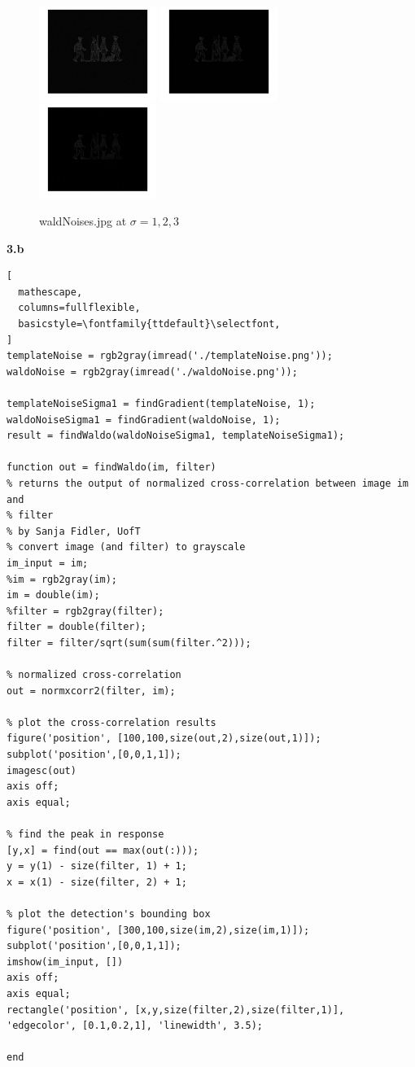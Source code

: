 \documentclass[11pt]{article}
\begin{document}
\begin{figure}[h]
  \caption{waldNoises.jpg at $\sigma = 1, 2, 3$ }
    \includegraphics[width=0.34\textwidth]{waldoNoiseSigma1}
    \includegraphics[width=0.34\textwidth]{waldoNoiseSigma2}
    \includegraphics[width=0.34\textwidth]{waldoNoiseSigma3}
\end{figure}

\newpage
\noindent
\textbf{3.b} 
\begin{lstlisting}[
  mathescape,
  columns=fullflexible,
  basicstyle=\fontfamily{ttdefault}\selectfont,
]
templateNoise = rgb2gray(imread('./templateNoise.png'));
waldoNoise = rgb2gray(imread('./waldoNoise.png'));

templateNoiseSigma1 = findGradient(templateNoise, 1);
waldoNoiseSigma1 = findGradient(waldoNoise, 1);
result = findWaldo(waldoNoiseSigma1, templateNoiseSigma1);

function out = findWaldo(im, filter)
% returns the output of normalized cross-correlation between image im and
% filter 
% by Sanja Fidler, UofT
% convert image (and filter) to grayscale
im_input = im;
%im = rgb2gray(im);
im = double(im);
%filter = rgb2gray(filter);
filter = double(filter);
filter = filter/sqrt(sum(sum(filter.^2)));

% normalized cross-correlation
out = normxcorr2(filter, im);

% plot the cross-correlation results
figure('position', [100,100,size(out,2),size(out,1)]);
subplot('position',[0,0,1,1]);
imagesc(out)
axis off;
axis equal;

% find the peak in response
[y,x] = find(out == max(out(:)));
y = y(1) - size(filter, 1) + 1;
x = x(1) - size(filter, 2) + 1;

% plot the detection's bounding box
figure('position', [300,100,size(im,2),size(im,1)]);
subplot('position',[0,0,1,1]);
imshow(im_input, [])
axis off;
axis equal;
rectangle('position', [x,y,size(filter,2),size(filter,1)], 'edgecolor', [0.1,0.2,1], 'linewidth', 3.5);

end
\end{lstlisting}
\newpage
\end{document}
